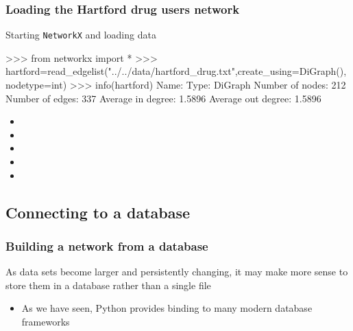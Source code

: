 \documentclass[xcolor=dvipsnames, 9pt]{beamer}
\newenvironment{code}{\begin{semiverbatim} \begin{footnotesize}}
{\end{footnotesize}\end{semiverbatim}}
\begin{document}
\begin{frame}[fragile]
    \frametitle{Loading the Hartford drug users network}
    \begin{block}{Starting \texttt{NetworkX} and loading data}
        \begin{code}
\scriptsize{>>> from networkx import *
>>> hartford=\alert<3>{read_edgelist}("\alert<4>{../../data/hartford_drug.txt}",\alert<5>{create_using=DiGraph()},\alert<6>{nodetype=int})
>>> \alert<7>{info(hartford)}
Name:                  
Type:                  DiGraph
Number of nodes:       212
Number of edges:       337
Average in degree:     1.5896
Average out degree:    1.5896}
        \end{code}
    \end{block}
\begin{itemize}
    \item {}
    \item {}
    \item {}
    \item {}
    \item {}
\end{itemize}
\end{frame}


\subsection{Connecting to a database} %
\label{sub:connecting_to_a_database}

\begin{frame}[fragile]
    \frametitle{Building a network from a database}
    As data sets become larger and persistently changing, it may make more sense to store them in a database rather than a single file
    \begin{itemize}
        \item As we have seen, Python provides binding to many modern database frameworks
    \end{itemize}
\end{frame}
\end{document}
